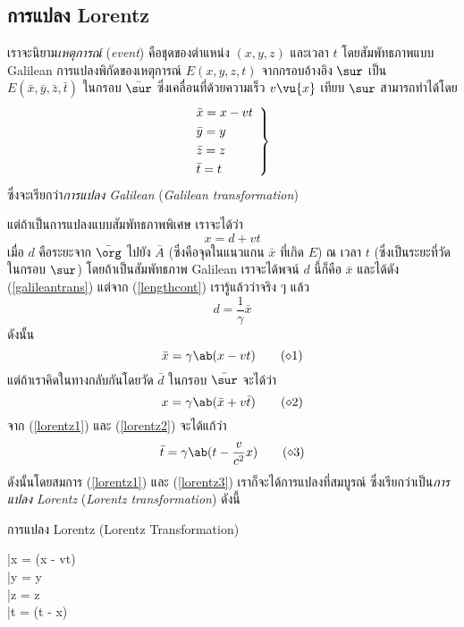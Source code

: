 \subsection{การแปลง Lorentz}

เราจะนิยาม\emph{เหตุการณ์} (\emph{event}) คือชุดของตำแหน่ง $(x,y,z)$ และเวลา $t$ โดยสัมพัทธภาพแบบ Galilean การแปลงพิกัดของเหตุการณ์ $E(x,y,z,t)$ จากกรอบอ้างอิง $\sur$ เป็น $E(\bar{x}, \bar{y}, \bar{z}, \bar{t})$ ในกรอบ $\bar{\sur}$ ซึ่งเคลื่อนที่ด้วยความเร็ว $v\vu{x}$ เทียบ $\sur$ สามารถทำได้โดย
\begin{equation}
    \begin{rcases}
        \bar{x} = x - vt\hspace{5pt}\\
        \bar{y} = y\\
        \bar{z} = z\\
        \bar{t} = t
    \end{rcases}\label{galileantrans}
\end{equation}
ซึ่งจะเรียกว่า\emph{การแปลง Galilean} (\emph{Galilean transformation})

แต่ถ้าเป็นการแปลงแบบสัมพัทธภาพพิเศษ เราจะได้ว่า
\[
x = d + vt
\]
เมื่อ $d$ คือระยะจาก $\bar{\org}$ ไปยัง $\bar{A}$ (ซึ่งคือจุดในแนวแกน $\bar{x}$ ที่เกิด $E$) ณ เวลา $t$ (ซึ่งเป็นระยะที่วัดในกรอบ $\sur$) โดยถ้าเป็นสัมพัทธภาพ Galilean เราจะได้พจน์ $d$ นี้ก็คือ $\bar{x}$ และได้ดัง (\ref{galileantrans}) แต่จาก (\ref{lengthcont}) เรารู้แล้วว่าจริง ๆ แล้ว
\[
d = \frac{1}{\gamma}\bar{x}
\]
ดังนั้น
\begin{equation}
    \bar{x} = \gamma\ab(x - vt)\tag{$\diamond$1}\label{lorentz1}
\end{equation}
แต่ถ้าเราคิดในทางกลับกันโดยวัด $\bar{d}$ ในกรอบ $\bar{\sur}$ จะได้ว่า
\begin{equation}
    x = \gamma\ab(\bar{x} + v\bar{t})\tag{$\diamond$2}\label{lorentz2}
\end{equation}
จาก (\ref{lorentz1}) และ (\ref{lorentz2}) จะได้แก้ว่า
\begin{equation}
    \bar{t} = \gamma\ab(t - \frac{v}{c^2}x)\tag{$\diamond$3}\label{lorentz3}
\end{equation}
ดังนั้นโดยสมการ (\ref{lorentz1}) และ (\ref{lorentz3}) เราก็จะได้การแปลงที่สมบูรณ์ ซึ่งเรียกว่าเป็น\emph{การแปลง Lorentz} (\emph{Lorentz transformation}) ดังนี้
\begin{ieqbox}{การแปลง Lorentz (Lorentz Transformation)}
    \begin{rcases}
        \bar{x} = \gamma(x - vt)\hspace{5pt}\\
        \bar{y} = y\\
        \bar{z} = z\\
        \bar{t} = \gamma\ab(t - x)
    \end{rcases}\label{lorentztrans}
\end{ieqbox}

